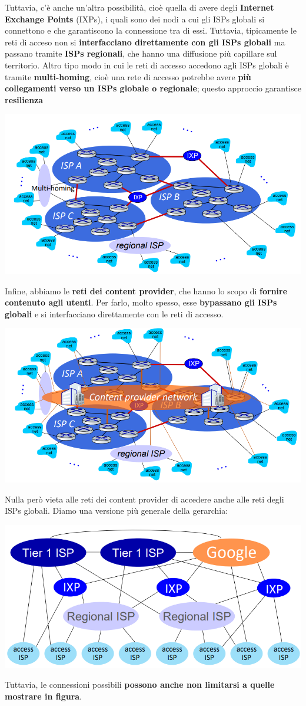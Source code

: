 \documentclass[12pt]{article}
\begin{document}
Tuttavia, c'è anche un'altra possibilità, cioè quella di avere degli \textbf{Internet Exchange Points} (IXPs), i quali sono dei nodi a cui gli ISPs globali si connettono e che garantiscono
la connessione tra di essi. Tuttavia, tipicamente le reti di acceso non si \textbf{interfacciano direttamente con gli ISPs globali} ma passano tramite \textbf{ISPs regionali}, che hanno una diffusione
più capillare sul territorio. Altro tipo modo in cui le reti di accesso accedono agli ISPs globali è tramite \textbf{multi-homing}, cioè una rete di accesso potrebbe avere \textbf{più collegamenti verso un ISPs globale o regionale};
questo approccio garantisce \textbf{resilienza}
\begin{center}
    \includegraphics[width =0.85\linewidth]{Images/15.PNG}
\end{center}
Infine, abbiamo le \textbf{reti dei content provider}, che hanno lo scopo di \textbf{fornire contenuto agli utenti}. Per farlo, molto spesso, esse \textbf{bypassano gli ISPs globali} e si interfacciano
direttamente con le reti di accesso.
\begin{center}
    \includegraphics[width =0.85\linewidth]{Images/16.PNG}
\end{center}
Nulla però vieta alle reti dei content provider di accedere anche alle reti degli ISPs globali.
Diamo una versione più generale della gerarchia:
\begin{center}
    \includegraphics[width =0.85\linewidth]{Images/17.PNG}
\end{center}
Tuttavia, le connessioni possibili \textbf{possono anche non limitarsi a quelle mostrare in figura}.
\end{document}
